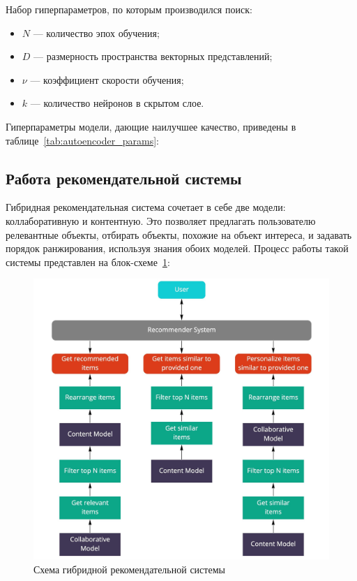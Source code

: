 \pagebreak
Набор гиперпараметров, по которым производился поиск:
\begin{itemize}
    \item $N$ --- количество эпох обучения;
    \item $D$ --- размерность пространства векторных представлений;
    \item $\nu$ --- коэффициент скорости обучения;
    \item $k$ --- количество нейронов в скрытом слое.
\end{itemize}

Гиперпараметры модели, дающие наилучшее качество, приведены в таблице~\ref{tab:autoencoder_params}:
\begin{table}[h]
    \caption{Гиперпараметры автоэнкодера}
    \label{tab:autoencoder_params}
\end{table}

\pagebreak
\subsection{Работа рекомендательной системы}\label{subsec:recommendations_obtaining}
Гибридная рекомендательная система сочетает в себе две модели: коллаборативную и контентную.
Это позволяет предлагать пользователю релевантные объекты, отбирать объекты, похожие на объект интереса, и задавать порядок ранжирования, используя знания обоих моделей.
Процесс работы такой системы представлен на блок-схеме~\ref{fig:hybrid_system_diagram}:

\vspace{1em}
\begin{figure}[h!]
\centering
\begin{minipage}{0.9\textwidth}
\centering
\includegraphics[width=0.9\linewidth]{images/hybrid_system_diagram}
\caption{Схема гибридной рекомендательной системы}
\label{fig:hybrid_system_diagram}
\end{minipage}
\end{figure}

